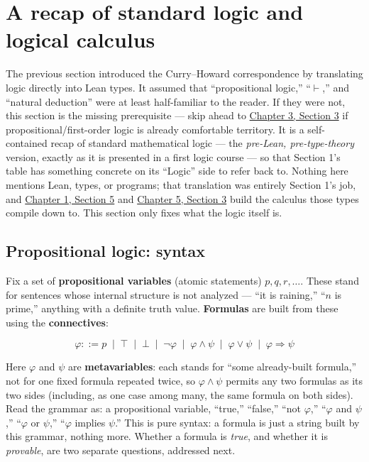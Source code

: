 \section{A recap of standard logic and logical calculus}\label{sec:03-propositions-and-proofs:02-logic-recap:1}

The previous section introduced the Curry--Howard correspondence by translating logic directly into Lean types. It assumed that ``propositional logic,'' ``\(\vdash\),'' and ``natural deduction'' were at least half-familiar to the reader. If they were not, this section is the missing prerequisite --- skip ahead to \hyperref[sec:03-propositions-and-proofs:03-theorem-lemma:1]{Chapter 3, Section 3} if propositional/first-order logic is already comfortable territory. It is a self-contained recap of standard mathematical logic --- the \emph{pre-Lean, pre-type-theory} version, exactly as it is presented in a first logic course --- so that Section 1's table has something concrete on its ``Logic'' side to refer back to. Nothing here mentions Lean, types, or programs; that translation was entirely Section 1's job, and \hyperref[sec:01-basics:05-pi-sigma-and-coc:1]{Chapter 1, Section 5} and \hyperref[sec:05-rigor-check:03-typing-rules-and-safety:1]{Chapter 5, Section 3} build the calculus those types compile down to. This section only fixes what the logic itself is.

\subsection{Propositional logic: syntax}\label{sec:03-propositions-and-proofs:02-logic-recap:2}

Fix a set of \textbf{propositional variables} (atomic statements) \(p, q, r,
\dots\). These stand for sentences whose internal structure is not analyzed --- ``it is raining,'' ``\(n\) is prime,'' anything with a definite truth value. \textbf{Formulas} are built from these using the \textbf{connectives}:

\[
\varphi ::= p \;\mid\; \top \;\mid\; \bot \;\mid\; \neg\varphi \;\mid\;
\varphi \wedge \psi \;\mid\; \varphi \vee \psi \;\mid\;
\varphi \Rightarrow \psi
\]

Here \(\varphi\) and \(\psi\) are \textbf{metavariables}: each stands for ``some already-built formula,'' not for one fixed formula repeated twice, so \(\varphi \wedge \psi\) permits any two formulas as its two sides (including, as one case among many, the same formula on both sides). Read the grammar as: a propositional variable, ``true,'' ``false,'' ``not \(\varphi\),'' ``\(\varphi\) and \(\psi\),'' ``\(\varphi\) or \(\psi\),'' ``\(\varphi\) implies \(\psi\).'' This is pure syntax: a formula is just a string built by this grammar, nothing more. Whether a formula is \emph{true}, and whether it is \emph{provable}, are two separate questions, addressed next.

